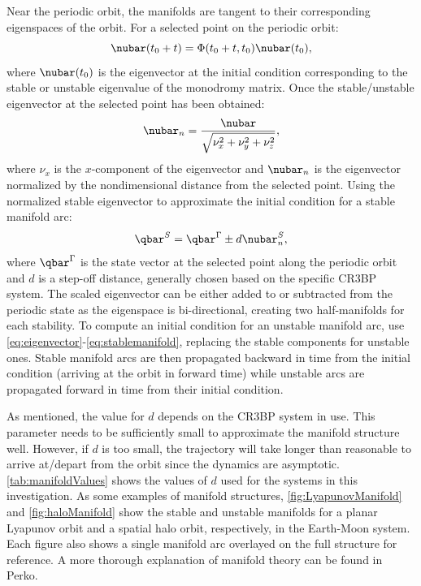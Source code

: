 Near the periodic orbit, the manifolds are tangent to their corresponding eigenspaces of the orbit.
For a selected point on the periodic orbit:
\begin{equation}
    \nubar(t_{0}+t)=\Phi(t_{0}+t,t_{0})\nubar(t_{0}),
    \label{eq:eigenvector}
\end{equation}
where $\nubar(t_{0})$ is the eigenvector at the initial condition corresponding to the stable or
unstable eigenvalue of the monodromy matrix. Once the stable/unstable eigenvector at the selected
point has been obtained:
\begin{equation}
    \nubar_{n}=\frac{\nubar}{\sqrt{\nu_{x}^{2}+\nu_{y}^{2}+\nu_{z}^{2}}},
    \label{eq:normeigenvector}
\end{equation}
where $\nu_{x}$ is the $x$-component of the eigenvector and $\nubar_{n}$ is the eigenvector
normalized by the nondimensional distance from the selected point. Using the normalized
stable eigenvector to approximate the initial condition for a stable manifold arc:
\begin{equation}
    \qbar^{S}=\qbar^{\Gamma}\pm d\nubar_{n}^{S},
    \label{eq:stablemanifold}
\end{equation}
where $\qbar^{\Gamma}$ is the state vector at the selected point along the periodic orbit and $d$
is a step-off distance, generally chosen based on the specific CR3BP system. The scaled eigenvector
can be either added to or subtracted from the periodic state as the eigenspace is bi-directional,
creating two half-manifolds for each stability. To compute an initial condition for an unstable
manifold arc, use \cref{eq:eigenvector}-\cref{eq:stablemanifold}, replacing the stable components
for unstable ones. Stable manifold arcs are then propagated backward in time from the initial
condition (arriving at the orbit in forward time) while unstable arcs are propagated forward in
time from their initial condition.

As mentioned, the value for $d$ depends on the CR3BP system in use. This parameter needs to be
sufficiently small to approximate the manifold structure well. However, if $d$ is too small, the
trajectory will take longer than reasonable to arrive at/depart from the orbit since the dynamics
are asymptotic\cite{Kakoi:2015}. \cref{tab:manifoldValues} shows the values of $d$ used for the
systems in this investigation. As some examples of manifold structures, \cref{fig:LyapunovManifold}
and \cref{fig:haloManifold} show the stable and unstable manifolds for a planar Lyapunov orbit and
a spatial halo orbit, respectively, in the Earth-Moon system. Each figure also shows a single
manifold arc overlayed on the full structure for reference. A more thorough explanation of manifold
theory can be found in Perko\cite{Perko:1991}.

